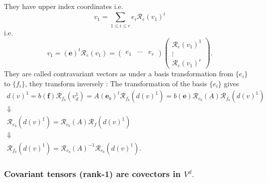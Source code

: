 \documentclass[aps,preprint]{revtex4}
\begin{document}
They have upper index coordinates i.e. 
\begin{equation}
v_{1}=\sum_{1\leq i\leq r}e_{i}\mathcal{R}_{e}\left( v_{1}\right) ^{i}
\end{equation}%
i.e.%
\begin{equation}
v_{1}=\left( \boldsymbol{e}\right) ^{t}\mathcal{R}_{e}\left( v_{1}\right)
=\left( 
\begin{array}{ccc}
e_{1} & \cdots & e_{r}%
\end{array}%
\right) \left( 
\begin{array}{c}
\mathcal{R}_{e}\left( v_{1}\right) ^{1} \\ 
\vdots \\ 
\mathcal{R}_{e}\left( v_{1}\right) ^{r}%
\end{array}%
\right) .
\end{equation}%
They are called contravariant vectors as under a basis transformation from $%
\{e_{i}\}$ to $\{f_{i}\}$, they transform inversely : The transformation of
the basis $\{e_{i}\}$ gives 
\begin{gather}
d\left( v\right) ^{1}=b\left( \boldsymbol{f}\right) \mathcal{R}%
_{f_{b}}\left( v_{d}^{1}\right) =A\left( \boldsymbol{e}_{b}\right) ^{t}%
\mathcal{R}_{f_{b}}\left( d\left( v\right) ^{1}\right) =b\left( \boldsymbol{e%
}\right) \mathcal{R}_{e_{b}}\left( A\right) \mathcal{R}_{f_{b}}\left(
d\left( v\right) ^{1}\right) \\
\Downarrow \\
\mathcal{R}_{e_{b}}\left( d\left( v\right) ^{1}\right) =\mathcal{R}%
_{e_{b}}\left( A\right) \mathcal{R}_{f}\left( d\left( v\right) ^{1}\right) \\
\Downarrow \\
\mathcal{R}_{f_{b}}\left( d\left( v\right) ^{1}\right) =\mathcal{R}%
_{e_{b}}\left( A\right) ^{-1}\mathcal{R}_{e_{b}}\left( d\left( v\right)
^{1}\right) .
\end{gather}

\subsubsection{\textbf{Covariant tensors} (rank-1) are covectors in $V^{d}.$ 
\label{Covariant tensors (rank-1) are covectors}}
\end{document}
